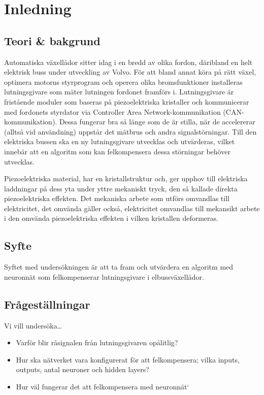 \section{Inledning}
\subsection{Teori \& bakgrund}

Automatiska växellådor sitter idag i en bredd av olika fordon, däribland en
helt elektrisk buss under utveckling av Volvo.
För att bland annat köra på rätt växel, optimera motorns styrprogram och operera
olika bromsfunktioner %
installeras lutningsgivare som mäter lutningen fordonet framförs i.
Lutningsgivare är fristående moduler som baseras på piezoelektriska
kristaller och kommunicerar med fordonets styrdator via Controller
Area Network-kommunikation (CAN-kommunikation).
Dessa fungerar bra så länge som de är stilla, när de accelererar (alltså vid
användning)  uppstår det mätbrus och andra signalstörningar.
Till den elektriska bussen ska en ny lutningsgivare utvecklas och utvärderas,
vilket innebär att en algoritm som kan felkompensera dessa störningar behöver
utvecklas.


Piezoelektriska material, har en kristallstruktur och, ger upphov till
elektriska laddningar på dess yta under yttre mekaniskt tryck, den så kallade
direkta piezoelektriska effekten.
Det mekaniska arbete som utförs omvandlas till elektricitet, det omvända gäller
också, elektricitet omvandlas till mekansikt arbete i den omvända
piezoelektriska effekten i vilken kristallen deformeras.
\autocite{electronicdesign2016}

\subsection{Syfte}
Syftet med undersökningen är att ta fram och utvärdera en algoritm med neuronnät som felkompenserar lutningsgivare i elbussväxellådor.

\subsection{Frågeställningar}
Vi vill undersöka\ldots
\begin{itemize}
	\item Varför blir råsignalen från lutningsgivaren opålitlig?
	\item Hur ska nätverket vara konfigurerat för att felkompensera; vilka inputs,
		outputs, antal neuroner och hidden layers?
	\item Hur väl fungerar det att felkompensera med neuronnät`
\end{itemize}
